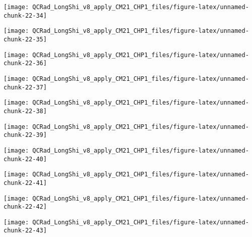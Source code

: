 \documentclass[
  10pt,
  a4paper,oneside]{article}
\begin{document}
\begin{center}\texttt{[image: QCRad\_LongShi\_v8\_apply\_CM21\_CHP1\_files/figure-latex/unnamed-chunk-22-34]} \end{center}

\begin{center}\texttt{[image: QCRad\_LongShi\_v8\_apply\_CM21\_CHP1\_files/figure-latex/unnamed-chunk-22-35]} \end{center}

\begin{center}\texttt{[image: QCRad\_LongShi\_v8\_apply\_CM21\_CHP1\_files/figure-latex/unnamed-chunk-22-36]} \end{center}

\begin{center}\texttt{[image: QCRad\_LongShi\_v8\_apply\_CM21\_CHP1\_files/figure-latex/unnamed-chunk-22-37]} \end{center}

\begin{center}\texttt{[image: QCRad\_LongShi\_v8\_apply\_CM21\_CHP1\_files/figure-latex/unnamed-chunk-22-38]} \end{center}

\begin{center}\texttt{[image: QCRad\_LongShi\_v8\_apply\_CM21\_CHP1\_files/figure-latex/unnamed-chunk-22-39]} \end{center}

\begin{center}\texttt{[image: QCRad\_LongShi\_v8\_apply\_CM21\_CHP1\_files/figure-latex/unnamed-chunk-22-40]} \end{center}

\begin{center}\texttt{[image: QCRad\_LongShi\_v8\_apply\_CM21\_CHP1\_files/figure-latex/unnamed-chunk-22-41]} \end{center}

\begin{center}\texttt{[image: QCRad\_LongShi\_v8\_apply\_CM21\_CHP1\_files/figure-latex/unnamed-chunk-22-42]} \end{center}

\begin{center}\texttt{[image: QCRad\_LongShi\_v8\_apply\_CM21\_CHP1\_files/figure-latex/unnamed-chunk-22-43]} \end{center}
\end{document}
